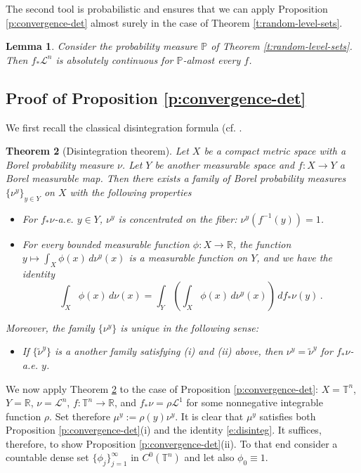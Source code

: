 \documentclass[11pt,reqno]{amsart}
\newcommand{\R}{\mathbb R}
\newtheorem{theorem}{Theorem}[section]
\newtheorem{lemma}[theorem]{Lemma}
\theoremstyle{definition}
\numberwithin{equation}{section}
\begin{document}
The second tool is probabilistic and ensures that we can apply Proposition \ref{p:convergence-det} almost surely in the case of Theorem \ref{t:random-level-sets}.

\begin{lemma}\label{l:Berman-OK}
Consider the probability measure $\mathbb P$ of Theorem \ref{t:random-level-sets}. Then $f_* \mathcal{L}^n$ is absolutely continuous for $\mathbb P$-almost every $f$.
\end{lemma}

\subsection{Proof of Proposition \ref{p:convergence-det}}
We first recall the classical disintegration formula (cf. \cite[Theorem 5.3.1]{AGS}.  

\begin{theorem}[Disintegration theorem]\label{t:disintegration}
Let $X$ be a compact metric space with a Borel probability measure $\nu$. Let $Y$ be another measurable space and $f:X\to Y$ a Borel measurable map. Then there exists a family of Borel probability measures $\{\nu^y\}_{y\in Y}$ on $X$ with the following properties
\begin{itemize}
    \item[(i)] For $f_*\nu$-a.e. $y\in Y$, $\nu^y$ is concentrated on the fiber: $\nu^y(f^{-1}(y))=1$.
    \item[(ii)] For every bounded measurable function $\phi:X\to\R$, the function $y\mapsto\int_X\phi(x)\,d\nu^y(x)$ is a measurable function on $Y$, and we have the identity
    \[
    \int_X\phi(x)\,d\nu(x)=\int_Y \left(\int_X\phi(x)\,d\nu^y(x)\right)\,df_*\nu(y)\, .
    \]
\end{itemize}
Moreover, the family $\{\nu^y\}$ is unique in the following sense:
\begin{itemize}
    \item[(iii)] If $\{\tilde{\nu}^y\}$ is a another family satisfying (i) and (ii) above, then $\nu^y=\tilde{\nu}^y$ for $f_*\nu$-a.e. $y$.
\end{itemize}
\end{theorem}

We now apply Theorem \ref{t:disintegration} to the case of Proposition \ref{p:convergence-det}: $X= \mathbb T^n$, $Y= \mathbb R$, $\nu= \mathcal{L}^n$, $f: \mathbb T^n \to \mathbb R$, and $f_* \nu = \rho \mathcal{L}^1$ for some nonnegative integrable function $\rho$. Set therefore $\mu^y := \rho (y) \nu^y$. It is clear that $\mu^y$ satisfies both Proposition \ref{p:convergence-det}(i) and the identity \eqref{e:disinteg}. It suffices, therefore, to show Proposition \ref{p:convergence-det}(ii). To that end consider a countable dense set $\{\phi_j\}_{j=1}^\infty$ in $C^0(\mathbb T^n)$ and let also $\phi_0\equiv 1$. 
\end{document}
